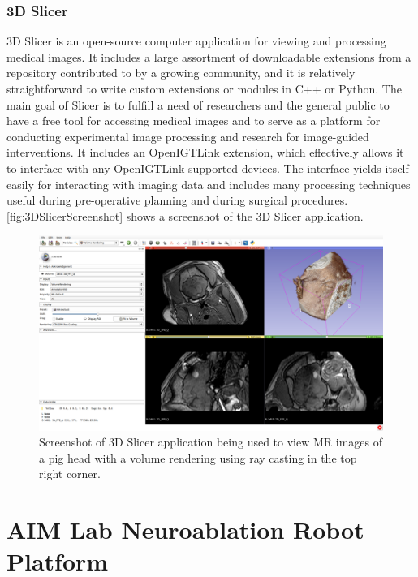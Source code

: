 \documentclass[12pt]{report}
\begin{document}
\subsubsection{3D Slicer}
3D Slicer is an open-source computer application for viewing and processing medical images. \cite{3DSlicerPaper} \cite{3DSlicer} It includes a large assortment of downloadable extensions from a repository contributed to by a growing community, and it is relatively straightforward to write custom extensions or modules in C++ or Python. The main goal of Slicer is to fulfill a need of researchers and the general public to have a free tool for accessing medical images and to serve as a platform for conducting experimental image processing and research for image-guided interventions. It includes an OpenIGTLink extension, which effectively allows it to interface with any OpenIGTLink-supported devices. The interface yields itself easily for interacting with imaging data and includes many processing techniques useful during pre-operative planning and during surgical procedures. \autoref{fig:3DSlicerScreenshot} shows a screenshot of the 3D Slicer application.

\begin{figure}[thpb]
	\centering
	\includegraphics[width=\textwidth]{images/Slicer_screenshot_pig.png}
    \caption{Screenshot of 3D Slicer application being used to view MR images of a pig head with a volume rendering using ray casting in the top right corner.}
    \label{fig:3DSlicerScreenshot}
\end{figure}


\section{AIM Lab Neuroablation Robot Platform}
\end{document}
